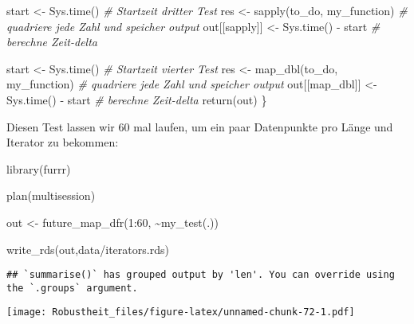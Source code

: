 \documentclass[
]{book}
\newenvironment{Shaded}{\begin{snugshade}}{\end{snugshade}}
\newcommand{\CommentTok}[1]{\textcolor[rgb]{0.56,0.35,0.01}{\textit{#1}}}
\newcommand{\DecValTok}[1]{\textcolor[rgb]{0.00,0.00,0.81}{#1}}
\newcommand{\FunctionTok}[1]{\textcolor[rgb]{0.00,0.00,0.00}{#1}}
\newcommand{\NormalTok}[1]{#1}
\newcommand{\OtherTok}[1]{\textcolor[rgb]{0.56,0.35,0.01}{#1}}
\newcommand{\SpecialCharTok}[1]{\textcolor[rgb]{0.00,0.00,0.00}{#1}}
\newcommand{\StringTok}[1]{\textcolor[rgb]{0.31,0.60,0.02}{#1}}
\begin{document}
\begin{Shaded}
\begin{Highlighting}[]
\NormalTok{  start }\OtherTok{\textless{}{-}} \FunctionTok{Sys.time}\NormalTok{() }\CommentTok{\# Startzeit dritter Test}
\NormalTok{  res }\OtherTok{\textless{}{-}} \FunctionTok{sapply}\NormalTok{(to\_do, my\_function) }\CommentTok{\# quadriere jede Zahl und speicher output}
\NormalTok{  out[[}\StringTok{\textquotesingle{}sapply\textquotesingle{}}\NormalTok{]] }\OtherTok{\textless{}{-}} \FunctionTok{Sys.time}\NormalTok{() }\SpecialCharTok{{-}}\NormalTok{ start }\CommentTok{\# berechne Zeit{-}delta}
  
\NormalTok{  start }\OtherTok{\textless{}{-}} \FunctionTok{Sys.time}\NormalTok{() }\CommentTok{\# Startzeit vierter Test}
\NormalTok{  res }\OtherTok{\textless{}{-}} \FunctionTok{map\_dbl}\NormalTok{(to\_do, my\_function) }\CommentTok{\# quadriere jede Zahl und speicher output}
\NormalTok{  out[[}\StringTok{\textquotesingle{}map\_dbl\textquotesingle{}}\NormalTok{]] }\OtherTok{\textless{}{-}} \FunctionTok{Sys.time}\NormalTok{() }\SpecialCharTok{{-}}\NormalTok{ start }\CommentTok{\# berechne Zeit{-}delta}
  \FunctionTok{return}\NormalTok{(out)}
\NormalTok{\}}
\end{Highlighting}
\end{Shaded}

Diesen Test lassen wir 60 mal laufen, um ein paar Datenpunkte pro Länge und Iterator zu bekommen:

\begin{Shaded}
\begin{Highlighting}[]
\FunctionTok{library}\NormalTok{(furrr)}

\FunctionTok{plan}\NormalTok{(multisession)}

\NormalTok{out }\OtherTok{\textless{}{-}} \FunctionTok{future\_map\_dfr}\NormalTok{(}\DecValTok{1}\SpecialCharTok{:}\DecValTok{60}\NormalTok{, }\SpecialCharTok{\textasciitilde{}}\FunctionTok{my\_test}\NormalTok{(.))}

\FunctionTok{write\_rds}\NormalTok{(out,}\StringTok{\textquotesingle{}data/iterators.rds\textquotesingle{}}\NormalTok{)}
\end{Highlighting}
\end{Shaded}

\begin{verbatim}
## `summarise()` has grouped output by 'len'. You can override using the `.groups` argument.
\end{verbatim}

\texttt{[image: Robustheit\_files/figure-latex/unnamed-chunk-72-1.pdf]}

  
\end{document}
